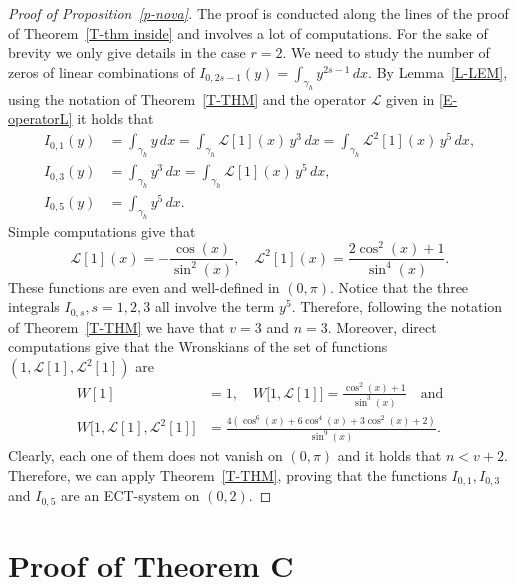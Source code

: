 \documentclass[12pt,psamsfonts]{amsart}
\begin{document}
\begin{proof}[Proof of Proposition~\ref{p-nova}]

The proof is conducted along the lines of the proof of Theorem~\ref{T-thm inside} and involves a lot of
computations. For the sake of brevity we only give details in the case $r=2.$ We need to study the
number of zeros of linear combinations of $I_{0,2s-1}(y)=\int_{\gamma_h} y^{2s-1}\,dx.$  By
Lemma~\ref{L-LEM}, using the notation of Theorem~\ref{T-THM} and the operator ${\mathscr{L}}$ given in
\eqref{E-operatorL} it holds that
\begin{align*}
I_{0,1}(y)&=\int_{\gamma_h} y\,dx= \int_{\gamma_h} {\mathscr{L}}[1](x)\, y^3\,dx= \int_{\gamma_h} {\mathscr{L}}^2[1](x)\,
 y^5\,dx,\\
I_{0,3}(y)&=\int_{\gamma_h} y^3\,dx= \int_{\gamma_h} {\mathscr{L}}[1](x)\, y^5\,dx,\\
I_{0,5}(y)&=\int_{\gamma_h} y^5\,dx.
\end{align*}
Simple computations give that
\[
{\mathscr{L}}[1](x)=-\frac{\cos(x)}{\sin^2(x)},\quad {\mathscr{L}}^2[1](x)=\frac{2\cos^2(x)+1}{\sin^4(x)}.
\]
These functions are even and well-defined in $(0,\pi).$
Notice that the three integrals $I_{0,s}, s=1,2,3$ all involve the term $y^5$. Therefore,  following
the notation of Theorem~\ref{T-THM} we have that $v=3$ and $n=3$.
Moreover, direct computations give that the Wronskians of the set of functions $(1,{\mathscr{L}}[1],{\mathscr{L}}^2[1])$
are
\begin{align*}
W[1]&=1,\quad W\big[1,{\mathscr{L}}[1]\big]=\frac{\cos^2(x)+1}{\sin^3(x)}\quad\mbox{and}\\
W\big[1,{\mathscr{L}}[1],{\mathscr{L}}^2[1]\big]&=\frac{4(\cos^6(x)+6\cos^4(x)+3\cos^2(x)+2)}{\sin^9(x)}.
\end{align*}
Clearly, each one of them does not vanish on $(0,\pi)$ and it holds that $n<v+2.$ Therefore, we
can apply Theorem~\ref{T-THM}, proving that the  functions $I_{0,1}, I_{0,3}$ and $I_{0,5}$ are an
ECT-system on $(0,2)$.
\end{proof}

\section{Proof of Theorem C}\label{pc}
\end{document}
